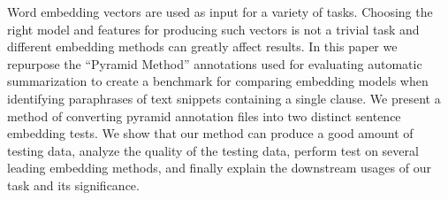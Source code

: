 Word embedding vectors are used as input for a variety of tasks. Choosing the right model and features for producing such vectors is not a trivial task and different embedding methods can greatly affect results. In this paper we repurpose the ``Pyramid Method'' annotations used for evaluating automatic summarization to create a benchmark for comparing embedding models when identifying paraphrases of text snippets containing a single clause. We present a method of converting pyramid annotation files into two distinct sentence embedding tests. We show that our method can produce a good amount of testing data, analyze the quality of the testing data, perform test on several leading embedding methods, and finally explain the downstream usages of our task and its significance.
